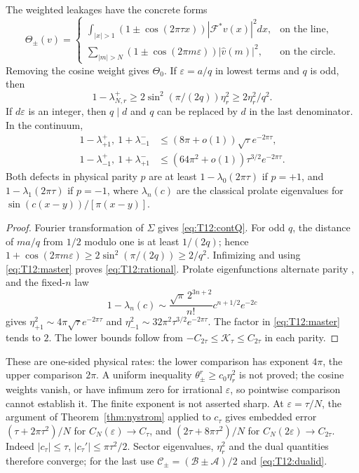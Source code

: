 \begin{corollary}
\label{prop:T12:rational}\label{cor:T12:fuchs}
The weighted leakages have the concrete forms
\begin{equation}\label{eq:T12:contQ}
\Theta_\pm(v)=
\begin{cases}
\displaystyle\int_{|x|>1}(1\pm\cos(2\pi\tau x))|\mathcal F^*v(x)|^2dx,
 &\text{on the line},\\[2mm]
\displaystyle\sum_{|m|>N}(1\pm\cos(2\pi m\varepsilon))|\widehat v(m)|^2,
 &\text{on the circle}.
\end{cases}
\end{equation}
Removing the cosine weight gives $\Theta_0$.
If $\varepsilon=a/q$ in lowest terms and $q$ is odd, then
\begin{equation}\label{eq:T12:rational}
1-\lambda_{N,r}^+\ge2\sin^2(\pi/(2q))\eta_r^2
\ge2\eta_r^2/q^2.
\end{equation}
If $d\varepsilon$ is an integer, then $q\mid d$ and $q$ can be
replaced by $d$ in the last denominator. In the continuum,
\begin{align}
1-\lambda_{+1}^+,\ 1+\lambda_{-1}^-&
\le(8\pi+o(1))\sqrt\tau e^{-2\pi\tau},\label{eq:T12:rate}\\
1-\lambda_{-1}^+,\ 1+\lambda_{+1}^-&
\le(64\pi^2+o(1))\tau^{3/2}e^{-2\pi\tau}.\nonumber
\end{align}
Both defects in physical parity $p$ are at least
$1-\lambda_0(2\pi\tau)$ if $p=+1$, and
$1-\lambda_1(2\pi\tau)$ if $p=-1$, where $\lambda_n(c)$ are the
classical prolate eigenvalues for $\sin(c(x-y))/[\pi(x-y)]$.
\end{corollary}
\begin{proof}
Fourier transformation of $\Sigma$ gives \eqref{eq:T12:contQ}.
For odd $q$, the distance of $ma/q$ from $1/2$ modulo one is at least
$1/(2q)$; hence $1+\cos(2\pi m\varepsilon)\ge
2\sin^2(\pi/(2q))\ge2/q^2$. Infimizing and using
\eqref{eq:T12:master} proves \eqref{eq:T12:rational}.
Prolate eigenfunctions alternate parity \cite{SlepianPollak1961},
and the fixed-$n$ law \cite{Fuchs1964,Slepian1965}
\[
1-\lambda_n(c)\sim\frac{\sqrt\pi\,2^{3n+2}}{n!}
c^{n+1/2}e^{-2c}
\]
gives $\eta_{+1}^2\sim4\pi\sqrt\tau e^{-2\pi\tau}$ and
$\eta_{-1}^2\sim32\pi^2\tau^{3/2}e^{-2\pi\tau}$.
The factor in \eqref{eq:T12:master} tends to $2$.
The lower bounds follow from
$-C_{2\tau}\le\mathcal K_\tau\le C_{2\tau}$ in each parity.
\end{proof}
These are one-sided physical rates: the lower comparison has exponent
$4\pi$, the upper comparison $2\pi$. A uniform inequality
$\theta_\pm^r\ge c_0\eta_r^2$ is not proved; the cosine weights vanish,
or have infimum zero for irrational $\varepsilon$, so pointwise
comparison cannot establish it. The finite exponent is not asserted sharp.
At $\varepsilon=\tau/N$, the argument of Theorem~\ref{thm:nystrom}
applied to $c_\tau$ gives embedded error $(\tau+2\pi\tau^2)/N$
for $C_N(\varepsilon)\to C_\tau$, and
$(2\tau+8\pi\tau^2)/N$ for $C_N(2\varepsilon)\to C_{2\tau}$.
Indeed $|c_\tau|\le\tau$, $|c_\tau'|\le\pi\tau^2/2$.
Sector eigenvalues, $\eta_r^2$ and the dual quantities therefore converge;
for the last use $\mathcal C_\pm=(\mathcal B\pm\mathcal A)/2$
and \eqref{eq:T12:dualid}.

